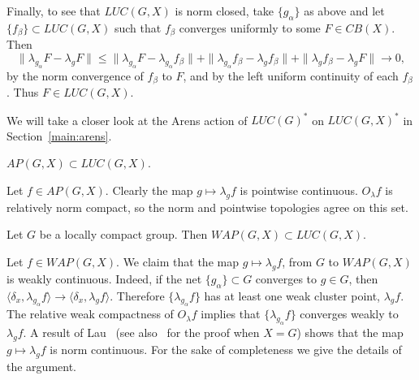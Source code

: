 Finally, to see that $LUC(G,X)$ is norm closed, take $\{g_\alpha\}$ as above and let $\{f_\beta\}\subset LUC(G,X)$
such that $f_\beta$ converges uniformly to some $F\in CB(X)$.  Then
\[
\|\lambda_{g_\alpha}F - \lambda_g F\| \leq \|\lambda_{g_\alpha}F - \lambda_{g_\alpha}f_\beta\| +
\|\lambda_{g_\alpha}f_\beta - \lambda_g f_\beta\| + \|\lambda_g f_\beta - \lambda_g F\| \rightarrow 0,
\]
by the norm convergence of $f_\beta$ to $F$, and by the left uniform continuity of each $f_\beta$.
Thus $F\in LUC(G,X)$.
\done

We will take a closer look at the Arens action of $LUC(G)^*$ on $LUC(G,X)^*$
in Section~\ref{main:arens}.

\begin{lemma}
$AP(G,X) \subset LUC(G,X)$.
\end{lemma}
\proof
Let $f\in AP(G,X)$.  Clearly the map $g\mapsto \lambda_g f$ is pointwise continuous.  $O_\lambda f$
is relatively norm compact, so the norm and pointwise topologies agree on this set.
\done

\begin{lemma}
Let $G$ be a locally compact group.  Then $WAP(G,X) \subset LUC(G,X)$.
\end{lemma}
\proof
Let $f\in WAP(G,X)$.  We claim that the map $g\mapsto \lambda_g f$, from $G$ to $WAP(G,X)$
is weakly continuous.  Indeed, if the net $\{g_\alpha\}\subset G$ converges to $g\in G$,
then $\langle \delta_x ,\lambda_{g_\alpha}f \rangle \rightarrow \langle \delta_x, \lambda_g f\rangle$.
Therefore $\{\lambda_{g_\alpha}f\}$ has at least one weak cluster point, $\lambda_g f$.  The relative
weak compactness of $O_\lambda f$ implies that $\{\lambda_{g_\alpha}f\}$ converges weakly to $\lambda_g f$.
A result of Lau~\cite[p. 151]{lau:actions} (see also~\cite[Theorem 7]{mitchell} for the proof when $X=G$) shows that the map
$g\mapsto \lambda_g f$ is norm continuous.  For the sake of completeness we give the details of the argument.

